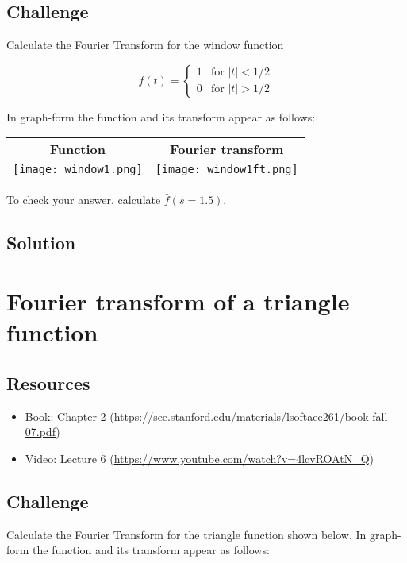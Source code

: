 \subsection*{Challenge}
Calculate the Fourier Transform for the window function

\begin{equation}
    f(t)=
    \begin{cases}
        1 & \text{for } |t| < 1/2 \\
        0 & \text{for } |t| > 1/2
    \end{cases}
\end{equation}

In graph-form the function and its transform appear as follows:

\begin{tabular}{cc}
    \textbf{Function} & \textbf{Fourier transform} \\
    \texttt{[image: window1.png]} & \texttt{[image: window1ft.png]}
\end{tabular}

To check your answer, calculate $\hat{f}(s=1.5)$.

\subsection*{Solution}

\timebox




\newpage
\section{Fourier transform of a triangle function}
\label{sec:ft_triangle}

\subsection*{Resources}
\begin{itemize}
    \item Book: Chapter 2 (\url{https://see.stanford.edu/materials/lsoftaee261/book-fall-07.pdf})
    \item Video: Lecture 6 (\url{https://www.youtube.com/watch?v=4lcvROAtN_Q})
\end{itemize}

\subsection*{Challenge}
Calculate the Fourier Transform for the triangle function shown below. In graph-form the function and its transform appear as follows:

